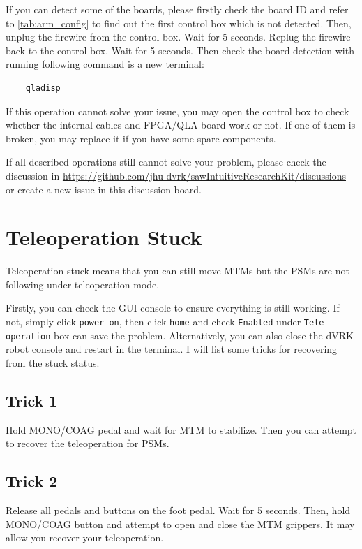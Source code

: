 If you can detect some of the boards, please firstly check the board ID and refer to \autoref{tab:arm_config} to find out the first control box which is not detected. Then, unplug the firewire from the control box. Wait for 5 seconds. Replug the firewire back to the control box. Wait for 5 seconds. Then check the board detection with running following command is a new terminal:

\begin{verbatim}
    qladisp
\end{verbatim}

If this operation cannot solve your issue, you may open the control box to check whether the internal cables and FPGA/QLA board work or not. If one of them is broken, you may replace it if you have some spare components. 

If all described operations still cannot solve your problem, please check the discussion in \url{https://github.com/jhu-dvrk/sawIntuitiveResearchKit/discussions} or create a new issue in this discussion board.

\section{Teleoperation Stuck}

Teleoperation stuck means that you can still move MTMs but the PSMs are not following under teleoperation mode.

Firstly, you can check the GUI console to ensure everything is still working. If not, simply click \texttt{power on}, then click \texttt{home} and check \texttt{Enabled} under \texttt{Tele operation} box can save the problem. Alternatively, you can also close the dVRK robot console and restart in the terminal. I will list some tricks for recovering from the stuck status.

\subsection{Trick 1}

Hold MONO/COAG pedal and wait for MTM to stabilize. Then you can attempt to recover the teleoperation for PSMs.

\subsection{Trick 2}

Release all pedals and buttons on the foot pedal. Wait for 5 seconds. Then, hold MONO/COAG button and attempt to open and close the MTM grippers. It may allow you recover your teleoperation.


